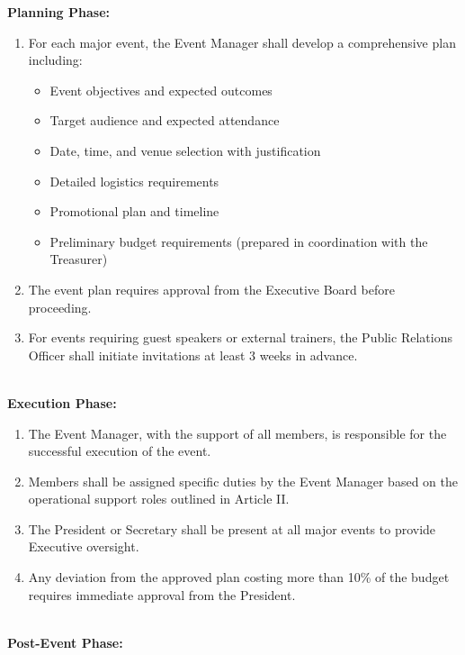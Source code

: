 
\textbf{Planning Phase:}
\begin{enumerate}[label=\alph*), leftmargin=2em, itemsep=0.3em]
    \item For each major event, the Event Manager shall develop a comprehensive plan including:
    \begin{itemize}[leftmargin=1.5em, itemsep=0.2em]
        \item Event objectives and expected outcomes
        \item Target audience and expected attendance
        \item Date, time, and venue selection with justification
        \item Detailed logistics requirements
        \item Promotional plan and timeline
        \item Preliminary budget requirements (prepared in coordination with the Treasurer)
    \end{itemize}
    \item The event plan requires approval from the Executive Board before proceeding.
    \item For events requiring guest speakers or external trainers, the Public Relations Officer shall initiate invitations at least 3 weeks in advance.
\end{enumerate}
\\
\textbf{Execution Phase:}
\begin{enumerate}[label=\alph*), leftmargin=2em, itemsep=0.3em]
    \item The Event Manager, with the support of all members, is responsible for the successful execution of the event.
    \item Members shall be assigned specific duties by the Event Manager based on the operational support roles outlined in Article II.
    \item The President or Secretary shall be present at all major events to provide Executive oversight.
    \item Any deviation from the approved plan costing more than 10\% of the budget requires immediate approval from the President.
\end{enumerate}
\\
\textbf{Post-Event Phase:}
